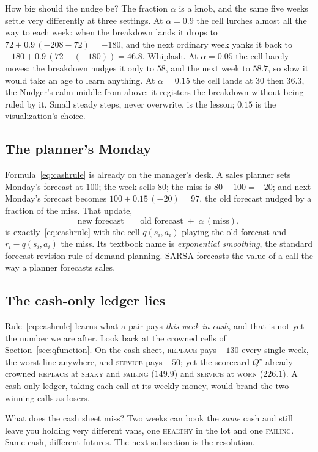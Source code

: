 \documentclass[11pt,a4paper]{article}
\theoremstyle{definition}
\theoremstyle{remark}
\numberwithin{equation}{section}
\newcommand{\sa}[1]{\textsc{#1}}   %
\begin{document}
How big should the nudge be? The fraction $\alpha$ is a knob, and the same five weeks settle
very differently at three settings. At $\alpha = 0.9$ the cell lurches almost all the way to
each week: when the breakdown lands it drops to $72 + 0.9\,(-208 - 72) = -180$, and the next
ordinary week yanks it back to $-180 + 0.9\,(72 - (-180)) = 46.8$. Whiplash. At $\alpha = 0.05$
the cell barely moves: the breakdown nudges it only to $58$, and the next week to $58.7$, so
slow it would take an age to learn anything. At $\alpha = 0.15$ the cell lands at $30$ then
$36.3$, the Nudger's calm middle from above: it registers the breakdown without being ruled by
it. Small steady steps, never overwrite, is the lesson; $0.15$ is the visualization's choice.

\subsection*{The planner's Monday}

Formula~\eqref{eq:cashrule} is already on the manager's desk. A sales planner sets Monday's
forecast at $100$; the week sells $80$; the miss is $80 - 100 = -20$; and next Monday's
forecast becomes $100 + 0.15\,(-20) = 97$, the old forecast nudged by a fraction of the miss.
That update,
\[
\text{new forecast} \;=\; \text{old forecast} \;+\; \alpha\,(\text{miss}),
\]
is exactly~\eqref{eq:cashrule} with the cell $q(s_i, a_i)$ playing the old forecast and
$r_i - q(s_i, a_i)$ the miss. Its textbook name is \emph{exponential smoothing}, the standard
forecast-revision rule of demand planning. SARSA forecasts the value of a call the way a
planner forecasts sales.

\subsection*{The cash-only ledger lies}

Rule~\eqref{eq:cashrule} learns what a pair pays \emph{this week in cash}, and that is not yet
the number we are after. Look back at the crowned cells of Section~\ref{sec:qfunction}. On the
cash sheet, \sa{replace} pays $-130$ every single week, the worst line anywhere, and
\sa{service} pays $-50$; yet the scorecard $Q^\star$ already crowned \sa{replace} at \sa{shaky}
and \sa{failing} ($149.9$) and \sa{service} at \sa{worn} ($226.1$). A cash-only ledger, taking
each call at its weekly money, would brand the two winning calls as losers.

What does the cash sheet miss? Two weeks can book the \emph{same} cash and still leave you
holding very different vans, one \sa{healthy} in the lot and one \sa{failing}. Same cash,
different futures. The next subsection is the resolution.
\end{document}
